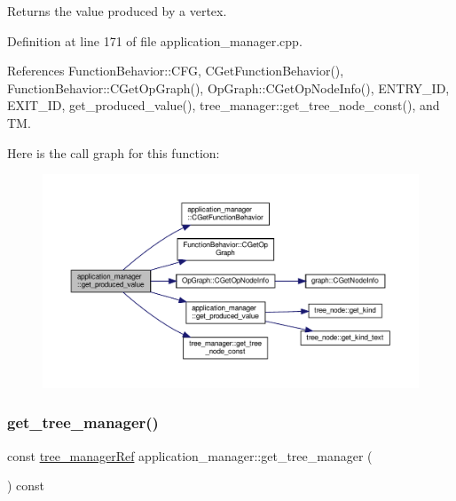 Returns the value produced by a vertex. 



Definition at line 171 of file application\+\_\+manager.\+cpp.



References Function\+Behavior\+::\+C\+FG, C\+Get\+Function\+Behavior(), Function\+Behavior\+::\+C\+Get\+Op\+Graph(), Op\+Graph\+::\+C\+Get\+Op\+Node\+Info(), E\+N\+T\+R\+Y\+\_\+\+ID, E\+X\+I\+T\+\_\+\+ID, get\+\_\+produced\+\_\+value(), tree\+\_\+manager\+::get\+\_\+tree\+\_\+node\+\_\+const(), and TM.

Here is the call graph for this function\+:
\nopagebreak
\begin{figure}[H]
\begin{center}
\leavevmode
\includegraphics[width=350pt]{dc/db5/classapplication__manager_ac4bb15c84ffb2500a40746e74b9f238c_cgraph}
\end{center}
\end{figure}
\mbox{\label{classapplication__manager_ab50fd317a5067408db989aa58a4c4507}} 
\subsubsection{\texorpdfstring{get\+\_\+tree\+\_\+manager()}{get\_tree\_manager()}}
{\footnotesize\ttfamily const \hyperlink{tree__manager_8hpp_a96ff150c071ce11a9a7a1e40590f205e}{tree\+\_\+manager\+Ref} application\+\_\+manager\+::get\+\_\+tree\+\_\+manager (\begin{DoxyParamCaption}{ }\end{DoxyParamCaption}) const}



